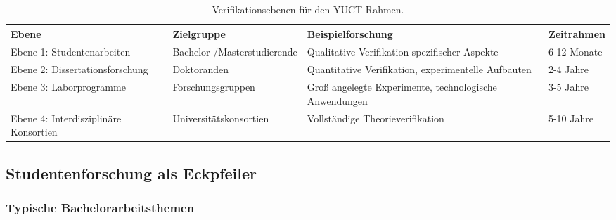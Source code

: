 \documentclass[12pt,a4paper]{article}
\begin{document}
	\begin{table}[h]
		\centering
		\begin{tabular}{p{}p{}p{}p{}}
			\toprule
			\textbf{Ebene} & \textbf{Zielgruppe} & \textbf{Beispielforschung} & \textbf{Zeitrahmen} \\
			\midrule
			Ebene 1: Studentenarbeiten & Bachelor-/Masterstudierende & Qualitative Verifikation spezifischer Aspekte & 6-12 Monate \\
			Ebene 2: Dissertationsforschung & Doktoranden & Quantitative Verifikation, experimentelle Aufbauten & 2-4 Jahre \\
			Ebene 3: Laborprogramme & Forschungsgruppen & Groß angelegte Experimente, technologische Anwendungen & 3-5 Jahre \\
			Ebene 4: Interdisziplinäre Konsortien & Universitätskonsortien & Vollständige Theorieverifikation & 5-10 Jahre \\
			\bottomrule
		\end{tabular}
		\caption{Verifikationsebenen für den YUCT-Rahmen.}
		\label{tab:verification-levels}
	\end{table}
	
	\subsection{Studentenforschung als Eckpfeiler}
	
	\subsubsection{Typische Bachelorarbeitsthemen}
	
\end{document}
